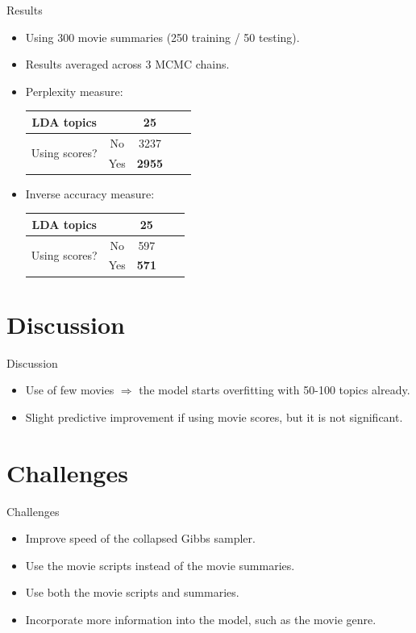 \documentclass{beamer}
\begin{document}
\begin{frame}{Results}
	\begin{itemize}
	\item Using 300 movie summaries (250 training / 50 testing).
	\item Results averaged across 3 MCMC chains.
	\item Perplexity measure:
	
	\begin{center}
	\begin{tabular}{cc|ccc}
		LDA topics      & & 25 \\ \hline
		\multirow{2}{*}{Using scores?} & No  & 3237 \\
		                               & Yes & \textbf{2955} \\
	\end{tabular}
	\end{center}
	
	\item Inverse accuracy measure:
	
	\begin{center}
	\begin{tabular}{cc|ccc}
		LDA topics      & & 25 \\ \hline
		\multirow{2}{*}{Using scores?} & No  & 597 \\
		                               & Yes & \textbf{571} \\
	\end{tabular}
	\end{center}
	\end{itemize}
\end{frame}

\section{Discussion}

\begin{frame}{Discussion}
	\begin{itemize}
	\item Use of few movies $\Rightarrow$ the model starts overfitting with 50-100 topics already.
	\item Slight predictive improvement if using movie scores, but it is not significant.
	\end{itemize}
\end{frame}

\section{Challenges}

\begin{frame}{Challenges}
	\begin{itemize}
	\item Improve speed of the collapsed Gibbs sampler.
	\item Use the movie scripts instead of the movie summaries.
	\item Use both the movie scripts and summaries.
	\item Incorporate more information into the model, such as the movie genre.
	\end{itemize}
\end{frame}
\end{document}
